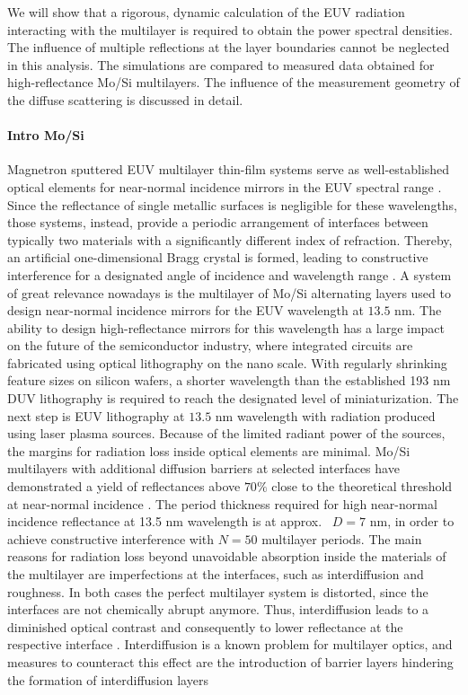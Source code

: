 We will show that a rigorous, dynamic calculation of the EUV radiation interacting with the multilayer is required to obtain the power spectral densities. The influence of multiple reflections at the layer boundaries cannot be neglected in this analysis. The simulations are compared to measured data obtained for high-reflectance Mo/Si multilayers. The influence of the measurement geometry of the diffuse scattering is discussed in detail.

\paragraph{Intro Mo/Si}
Magnetron sputtered EUV multilayer thin-film systems serve as well-established optical elements for near-normal incidence mirrors in the EUV spectral range \cite{martinez-galarce_high_2000,barbee_jr._multi-spectral_1991,toyoda_soft-x-ray_2000,finkenthal_near_1990}. Since the reflectance of single metallic surfaces is negligible for these wavelengths, those systems, instead, provide a periodic arrangement of interfaces between typically two materials with a significantly different index of refraction. Thereby, an artificial one-dimensional Bragg crystal is formed, leading to constructive interference for a designated angle of incidence and wavelength range \cite{spiller_low-loss_1972}. A system of great relevance nowadays is the multilayer of Mo/Si alternating layers used to design near-normal incidence mirrors for the EUV wavelength at $13.5$ nm. The ability to design high-reflectance mirrors for this wavelength has a large impact on the future of the semiconductor industry, where integrated circuits are fabricated using optical lithography on the nano scale. With regularly shrinking feature sizes on silicon wafers, a shorter wavelength than the established 193 nm DUV lithography is required to reach the designated level of miniaturization. The next step is EUV lithography at $13.5$ nm wavelength with radiation produced using laser plasma sources. Because of the limited radiant power of the sources, the margins for radiation loss inside optical elements are minimal. Mo/Si multilayers with additional diffusion barriers at selected interfaces have demonstrated a yield of reflectances above $70\%$ close to the theoretical threshold at near-normal incidence \cite{barbee_molybdenum-silicon_1985,stearns_fabrication_1991,bajt_improved_2002,braun_grenzflachen-optimierte_2003}. The period thickness required for high near-normal incidence reflectance at 13.5 nm wavelength is at approx.~ $D=7$ nm, in order to achieve constructive interference with $N=50$ multilayer periods. The main reasons for radiation loss beyond unavoidable absorption inside the materials of the multilayer are imperfections at the interfaces, such as interdiffusion and roughness. In both cases the perfect multilayer system is distorted, since the interfaces are not chemically abrupt anymore. Thus, interdiffusion leads to a diminished optical contrast and consequently to lower reflectance at the respective interface \cite{nakajima_interdiffusion_1988}. Interdiffusion is a known problem for multilayer optics, and measures to counteract this effect are the introduction of barrier layers hindering the formation of interdiffusion layers 